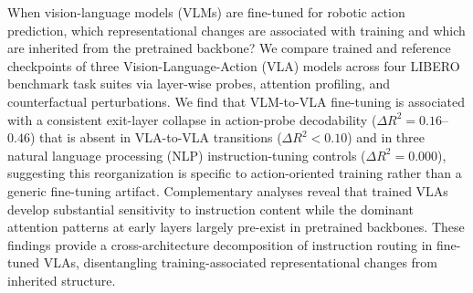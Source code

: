 When vision-language models (VLMs) are fine-tuned for robotic action prediction, which representational changes are associated with training and which are inherited from the pretrained backbone?
We compare trained and reference checkpoints of three Vision-Language-Action (VLA) models across four LIBERO benchmark task suites via layer-wise probes, attention profiling, and counterfactual perturbations.
We find that VLM-to-VLA fine-tuning is associated with a consistent exit-layer collapse in action-probe decodability ($\Delta R^2 = 0.16$--$0.46$) that is absent in VLA-to-VLA transitions ($\Delta R^2 < 0.10$) and in three natural language processing (NLP) instruction-tuning controls ($\Delta R^2 = 0.000$), suggesting this reorganization is specific to action-oriented training rather than a generic fine-tuning artifact.
Complementary analyses reveal that trained VLAs develop substantial sensitivity to instruction content while the dominant attention patterns at early layers largely pre-exist in pretrained backbones.
These findings provide a cross-architecture decomposition of instruction routing in fine-tuned VLAs, disentangling training-associated representational changes from inherited structure.
